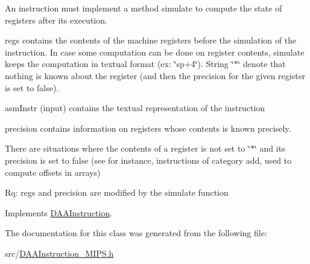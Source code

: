 An instruction must implement a method simulate to compute the state of registers after its execution.

regs contains the contents of the machine registers before the simulation of the instruction. In case some computation can be done on register contents, simulate keeps the computation in textual format (ex\+: \char`\"{}sp+4\char`\"{}). String \char`\"{}$\ast$\char`\"{} denote that nothing is known about the register (and then the precision for the given register is set to false).

asm\+Instr (input) contains the textual representation of the instruction

precision contains information on registers whose contents is known precisely.

There are situations where the contents of a register is not set to \char`\"{}$\ast$\char`\"{} and its precision is set to false (see for instance, instructions of category add, used to compute offsets in arrays)

Rq\+: regs and precision are modified by the simulate function 

Implements \hyperlink{classDAAInstruction_a61d0b9bece1e0ead89a46c0197276324}{D\+A\+A\+Instruction}.



The documentation for this class was generated from the following file\+:\begin{DoxyCompactItemize}
\item 
src/\hyperlink{DAAInstruction__MIPS_8h}{D\+A\+A\+Instruction\+\_\+\+M\+I\+P\+S.\+h}\end{DoxyCompactItemize}
